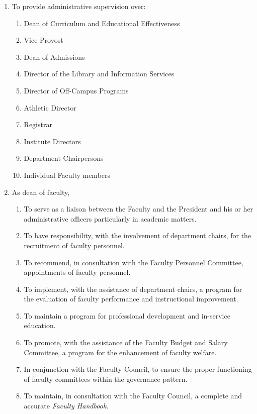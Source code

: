 \documentclass[letterpaper, 11pt]{article}
\begin{document}
\begin{enumerate}
{\begin{enumerate}
{\begin{enumerate}
										\item{To provide administrative supervision over:
											\begin{enumerate}
												\item{Dean of Curriculum and Educational Effectiveness}
												\item{Vice Provost}
												\item{Dean of Admissions}
												\item{Director of the Library and Information Services}
												\item{Director of Off-Campus Programs}
												\item{Athletic Director}
												\item{Registrar}
												\item{Institute Directors}
												\item{Department Chairpersons}
												\item{ Individual Faculty members}
											\end{enumerate}
										}
										\item{As dean of faculty,
											\begin{enumerate}
												\item{To serve as a liaison between the Faculty and the President and his or her administrative officers particularly in academic matters.}
												\item{To have responsibility, with the involvement of department chairs, for the recruitment of faculty personnel.}
												\item{To recommend, in consultation with the Faculty Personnel Committee, appointments of faculty personnel.}
												\item{To implement, with the assistance of department chairs, a program for the evaluation of faculty performance and instructional improvement.}
												\item{To maintain a program for professional development and in-service education.}
												\item{To promote, with the assistance of the Faculty Budget and Salary Committee, a program for the enhancement of faculty welfare.}
												\item{In conjunction with the Faculty Council, to ensure the proper functioning of faculty committees within the governance pattern.}
												\item{To maintain, in consultation with the Faculty Council, a complete and accurate \emph{Faculty Handbook}.}

\end{enumerate}}
\end{enumerate}}
\end{enumerate}}
\end{enumerate}
\end{document}
